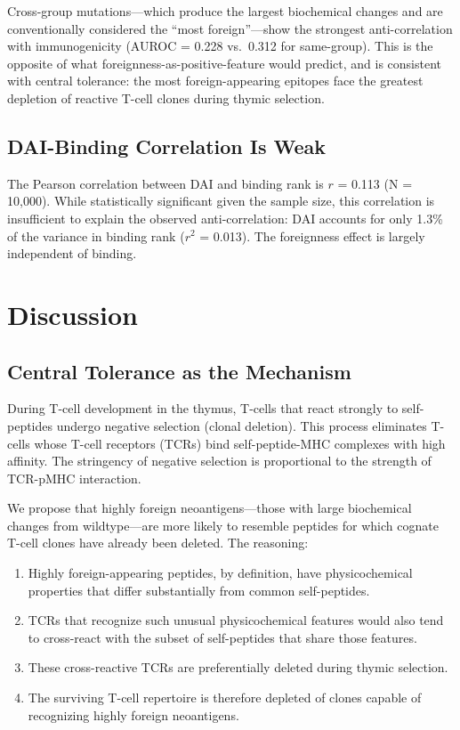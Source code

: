\documentclass[11pt,twocolumn]{article}
\begin{document}
Cross-group mutations---which produce the largest biochemical changes and are conventionally considered the ``most foreign''---show the strongest anti-correlation with immunogenicity (AUROC = 0.228 vs.\ 0.312 for same-group). This is the opposite of what foreignness-as-positive-feature would predict, and is consistent with central tolerance: the most foreign-appearing epitopes face the greatest depletion of reactive T-cell clones during thymic selection.

\subsection{DAI-Binding Correlation Is Weak}

The Pearson correlation between DAI and binding rank is $r$ = 0.113 (N = 10,000). While statistically significant given the sample size, this correlation is insufficient to explain the observed anti-correlation: DAI accounts for only 1.3\% of the variance in binding rank ($r^2$ = 0.013). The foreignness effect is largely independent of binding.

\section{Discussion}

\subsection{Central Tolerance as the Mechanism}

During T-cell development in the thymus, T-cells that react strongly to self-peptides undergo negative selection (clonal deletion). This process eliminates T-cells whose T-cell receptors (TCRs) bind self-peptide-MHC complexes with high affinity. The stringency of negative selection is proportional to the strength of TCR-pMHC interaction.

We propose that highly foreign neoantigens---those with large biochemical changes from wildtype---are more likely to resemble peptides for which cognate T-cell clones have already been deleted. The reasoning:

\begin{enumerate}[leftmargin=*,topsep=0pt,itemsep=2pt]
\item Highly foreign-appearing peptides, by definition, have physicochemical properties that differ substantially from common self-peptides.
\item TCRs that recognize such unusual physicochemical features would also tend to cross-react with the subset of self-peptides that share those features.
\item These cross-reactive TCRs are preferentially deleted during thymic selection.
\item The surviving T-cell repertoire is therefore depleted of clones capable of recognizing highly foreign neoantigens.
\end{enumerate}
\end{document}
